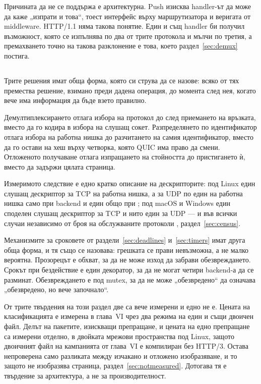 Причината да не се поддържа е архитектурна. Push изисква handler-ът да може да каже
„изпрати и това“, тоест интерфейс върху маршрутизатора и веригата от middleware. HTTP/1.1
няма такова понятие. Един и същ handler би получил възможност, която се изпълнява по два от
трите протокола и мълчи по третия, а премахването точно на такова разклонение е това, което
раздел~\ref{sec:demux} постига.

\subsection{}

Трите решения имат обща форма, която си струва да се назове: всяко от тях премества
решение, взимано преди дадена операция, до момента след нея, когато вече има информация да
бъде взето правилно.

Демултиплексирането отлага избора на протокол до след приемането на връзката, вместо да го
кодира в избора на слушащ сокет. Разпределянето по идентификатор отлага избора на работна
нишка до разчитането на самия идентификатор, вместо да го остави на хеш върху четворка,
която QUIC има право да смени. Отложеното получаване отлага изпращането на стойността до
пристигането ѝ, вместо да задържи цялата страница.

Измеримото следствие е едно кратко описание на дескрипторите: под Linux един слушащ
дескриптор за TCP на работна нишка, а за UDP по един на работна нишка само при backend
 и един общо при ; под macOS и Windows един споделен слушащ
дескриптор за TCP и нито един за UDP — и във всички случаи независимо от броя на обслужваните
протоколи , раздел~\ref{sec:census}.

Механизмите за сроковете от раздели~\ref{sec:deadlines} и~\ref{sec:timers} имат друга обща
форма, и тя също се назовава: грешката се прави невъзможна, а не малко вероятна.
Прозорецът е обхват, за да не може изход да забрави обезвреждането. Срокът при бездействие
е един декоратор, за да не могат четири backend-а да се разминат. Обезвреждането е под
mutex, за да не може „обезвредено“ да означава „обезвредено, но вече започнало“.

От трите твърдения на този раздел две са вече измерени и едно не е. Цената на класификацията е
измерена в глава~VI чрез два режима на един и същи двоичен файл. Делът на пакетите, изискващи
препращане, и цената на едно препращане са измерени отделно, в двойката мрежови пространства под
Linux, защото двоичният файл на кампанията от глава~VI е компилиран без HTTP/3.
Остава непроверена само разликата между изчакано и отложено изобразяване, и то защото
 не изобразява страница, раздел~\ref{sec:notmeasured}. Дотогава тя е твърдение за
архитектура, а не за производителност.

